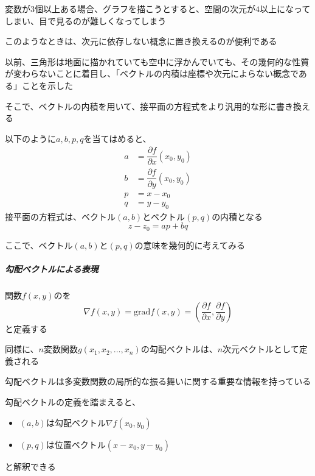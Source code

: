 \documentclass[../book_jiriki_calc]{subfiles}
\begin{document}
\sectionline

変数が3個以上ある場合、グラフを描こうとすると、空間の次元が$4$以上になってしまい、目で見るのが難しくなってしまう

このようなときは、次元に依存しない概念に置き換えるのが便利である

\br

以前、三角形は地面に描かれていても空中に浮かんでいても、その幾何的な性質が変わらないことに着目し、「ベクトルの内積は座標や次元によらない概念である」ことを示した

そこで、ベクトルの内積を用いて、接平面の方程式をより汎用的な形に書き換える

\br

以下のように$a,b,p,q$を当てはめると、
\begin{align*}
  a & = \dfrac{\partial f}{\partial x}(x_0,y_0) \\
  b & = \dfrac{\partial f}{\partial y}(x_0,y_0) \\
  p & = x-x_0 \\
  q & = y-y_0
\end{align*}
接平面の方程式は、ベクトル$(a,b)$とベクトル$(p,q)$の内積となる
\begin{equation*}
  z - z_0 = ap + bq
\end{equation*}

ここで、ベクトル$(a,b)$と$(p,q)$の意味を幾何的に考えてみる

\br

\subparagraph{勾配ベクトルによる表現}\quad

関数$f(x,y)$のを
\begin{equation*}
  \nabla f(x,y) = \mathrm{grad} f(x,y) = \left(\dfrac{\partial f}{\partial x},\dfrac{\partial f}{\partial y}\right)
\end{equation*}
と定義する

同様に、$n$変数関数$g(x_1,x_2,\ldots,x_n)$の勾配ベクトルは、$n$次元ベクトルとして定義される

\br

勾配ベクトルは多変数関数の局所的な振る舞いに関する重要な情報を持っている

\br

勾配ベクトルの定義を踏まえると、
\begin{itemize}
  \item $(a,b)$は勾配ベクトル$\nabla f(x_0,y_0)$
  \item $(p,q)$は位置ベクトル$(x-x_0,y-y_0)$
\end{itemize}
と解釈できる
\end{document}
